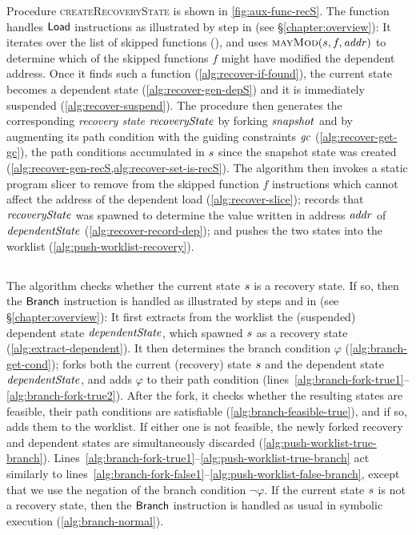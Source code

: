 Procedure \textsc{createRecoveryState} is shown in
\ref{fig:aux-func-recS}. The function handles $\mathsf{Load}$
instructions as illustrated by step  in 
(see \S\ref{chapter:overview}): It iterates over the list of skipped
functions (), and uses
$\Call{mayMod}{\workstate, f, \addr}$ to determine which of the skipped
functions $f$ might have modified the dependent address. Once it finds
such a function (\cref{alg:recover-if-found}), the current state
becomes a dependent state (\cref{alg:recover-gen-depS}) and it is
immediately suspended (\cref{alg:recover-suspend}). The procedure then
generates the corresponding \emph{recovery state} $\mathit{recoveryState}$ by
forking $\mathit{snapshot}$ and by augmenting its path condition with the
guiding constraints $\mathit{gc}$ (\cref{alg:recover-get-gc}), \ie the path
conditions accumulated in $s$ since the snapshot state was
created (\cref{alg:recover-gen-recS,alg:recover-set-is-recS}). The
algorithm then invokes a static program slicer to remove from the
skipped function $f$ instructions which cannot affect the address of
the dependent load (\cref{alg:recover-slice}); records that
$\mathit{recoveryState}$ was spawned to determine the value written in address
$\mathit{addr}$ of $\mathit{dependentState}$ (\cref{alg:recover-record-dep}); and
pushes the two states into the worklist
(\cref{alg:push-worklist-recovery}).

\subsection{}

The algorithm checks whether the current state $s$ is a
recovery state. If so, then the $\mathsf{Branch}$ instruction is
handled as illustrated by steps  and  in
 (see \S\ref{chapter:overview}): It first extracts from
the worklist the (suspended) dependent state $\mathit{dependentState}$, which
spawned $s$ as a recovery state
(\cref{alg:extract-dependent}).  It then determines the branch
condition $\varphi$ (\cref{alg:branch-get-cond}); forks both the
current (recovery) state $s$ and the dependent state
$\mathit{dependentState}$, and adds $\varphi$ to their path condition
(lines~\ref{alg:branch-fork-true1}--\ref{alg:branch-fork-true2}).
After the fork, it checks whether the resulting states are feasible,
\ie their path conditions are satisfiable
(\cref{alg:branch-feasible-true}), and if so, adds them to the
worklist. If either one is not feasible, the newly forked recovery and
dependent states are simultaneously discarded
(\cref{alg:push-worklist-true-branch}).
Lines~\ref{alg:branch-fork-true1}--\ref{alg:push-worklist-true-branch}
act similarly to
lines~\ref{alg:branch-fork-false1}--\ref{alg:push-worklist-false-branch},
except that we use the negation of the branch condition
$\neg\varphi$. If the current state $s$ is not a recovery
state, then the $\mathsf{Branch}$ instruction is handled as usual in
symbolic execution (\cref{alg:branch-normal}).

